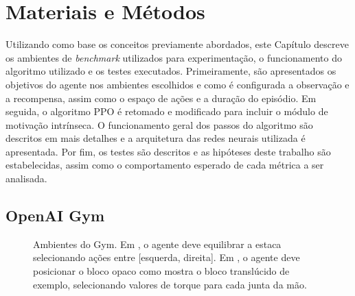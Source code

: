\chapter{Materiais e Métodos}
\label{cap:metodologia}

Utilizando como base os conceitos previamente abordados, este Capítulo descreve os ambientes de \textit{benchmark} utilizados para experimentação, o funcionamento do algoritmo utilizado e os testes executados. Primeiramente, são apresentados os objetivos do agente nos ambientes escolhidos e como é configurada a observação e a recompensa, assim como o espaço de ações e a duração do episódio. Em seguida, o algoritmo PPO é retomado e modificado para incluir o módulo de motivação intrínseca. O funcionamento geral dos passos do algoritmo são descritos em mais detalhes e a arquitetura das redes neurais utilizada é apresentada. Por fim, os testes são descritos e as hipóteses deste trabalho são estabelecidas, assim como o comportamento esperado de cada métrica a ser analisada.


\section{OpenAI Gym}
\label{sec:gym}

\begin{figure}[hb]
 \centering
   \qquad
   \captionsetup{width=1\textwidth}
   \caption[Ambientes do Gym.]{Ambientes do Gym. Em {}, o agente deve equilibrar a estaca selecionando ações entre [esquerda, direita]. Em {}, o agente deve posicionar o bloco opaco como mostra o bloco translúcido de exemplo, selecionando valores de torque para cada junta da mão.}
  \label{fig:gymenvs}
\end{figure}

